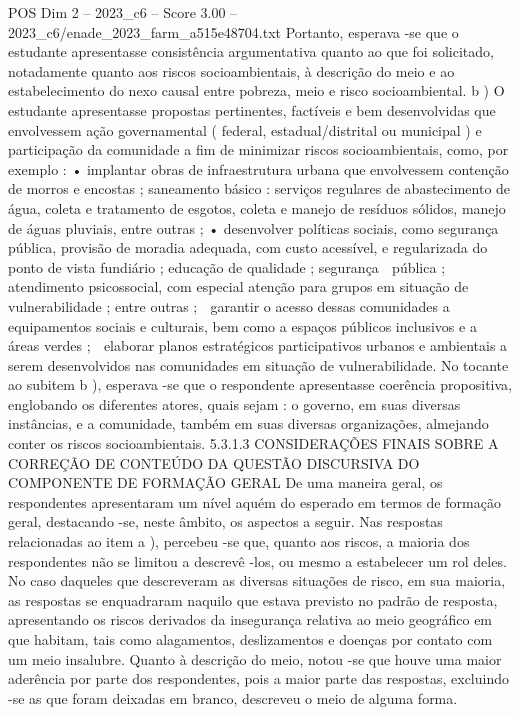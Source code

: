 \begin{textsample}{POS Dim 2 – 2023\_c6 – Score 3.00 – 2023\_c6/enade\_2023\_farm\_a515e48704.txt}
Portanto, esperava -se que o estudante apresentasse consistência argumentativa quanto ao que foi solicitado, notadamente quanto aos riscos socioambientais, à descrição do meio e ao estabelecimento do nexo causal entre pobreza, meio e risco socioambiental. b ) O estudante apresentasse propostas pertinentes, factíveis e bem desenvolvidas que envolvessem ação governamental ( federal, estadual/distrital ou municipal ) e participação da comunidade a fim de minimizar riscos socioambientais, como, por exemplo : • implantar obras de infraestrutura urbana que envolvessem contenção de morros e encostas ; saneamento básico : serviços regulares de abastecimento de água, coleta e tratamento de esgotos, coleta e manejo de resíduos sólidos, manejo de águas pluviais, entre outras ; • desenvolver políticas sociais, como segurança pública, provisão de moradia adequada, com custo acessível, e regularizada do ponto de vista fundiário ; educação de qualidade ; segurança  pública ; atendimento psicossocial, com especial atenção para grupos em situação de vulnerabilidade ; entre outras ;  garantir o acesso dessas comunidades a equipamentos sociais e culturais, bem como a espaços públicos inclusivos e a áreas verdes ;  elaborar planos estratégicos participativos urbanos e ambientais a serem desenvolvidos nas comunidades em situação de vulnerabilidade.
No tocante ao subitem b ), esperava -se que o respondente apresentasse coerência propositiva, englobando os diferentes atores, quais sejam : o governo, em suas diversas instâncias, e a comunidade, também em suas diversas organizações, almejando conter os riscos socioambientais. 5.3.1.3 CONSIDERAÇÕES FINAIS SOBRE A CORREÇÃO DE CONTEÚDO DA QUESTÃO DISCURSIVA DO COMPONENTE DE FORMAÇÃO GERAL De uma maneira geral, os respondentes apresentaram um nível aquém do esperado em termos de formação geral, destacando -se, neste âmbito, os aspectos a seguir.
Nas respostas relacionadas ao item a ), percebeu -se que, quanto aos riscos, a maioria dos respondentes não se limitou a descrevê -los, ou mesmo a estabelecer um rol deles.
No caso daqueles que descreveram as diversas situações de risco, em sua maioria, as respostas se enquadraram naquilo que estava previsto no padrão de resposta, apresentando os riscos derivados da insegurança relativa ao meio geográfico em que habitam, tais como alagamentos, deslizamentos e doenças por contato com um meio insalubre.
Quanto à descrição do meio, notou -se que houve uma maior aderência por parte dos respondentes, pois a maior parte das respostas, excluindo -se as que foram deixadas em branco, descreveu o meio de alguma forma.

\end{textsample}
